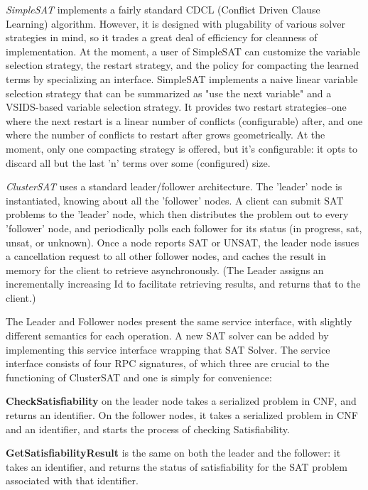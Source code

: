\documentclass[10pt]{article}
\begin{document}
  \textit{SimpleSAT} implements a fairly standard CDCL (Conflict Driven Clause Learning) algorithm.  However, it is designed with plugability of various
  solver strategies in mind, so it trades a great deal of efficiency for cleanness of implementation.  At the moment, a user of SimpleSAT can customize
  the variable selection strategy, the restart strategy, and the policy for compacting the learned terms by specializing an interface.  SimpleSAT implements
  a naive linear variable selection strategy that can be summarized as "use the next variable" and a VSIDS-based variable selection strategy.  It provides two
  restart strategies--one where the next restart is a linear number of conflicts (configurable) after, and one where the number of conflicts to restart after grows geometrically.
  At the moment, only one compacting strategy is offered, but it's configurable:  it opts to discard all but the last 'n' terms over some (configured) size.
  
  \textit{ClusterSAT} uses a standard leader/follower architecture.  The 'leader' node is instantiated, knowing about all the 'follower' nodes.  A client
  can submit SAT problems to the 'leader' node, which then distributes the problem out to every 'follower' node, and periodically polls each follower
  for its status (in progress, sat, unsat, or unknown).  Once a node reports SAT or UNSAT, the leader node issues a cancellation request to all other follower nodes, and 
  caches the result in memory for the client to retrieve asynchronously.  (The Leader assigns an incrementally increasing Id to facilitate retrieving results, and returns that to the client.)
  
  The Leader and Follower nodes present the same service interface, with slightly different semantics for each operation.  A new SAT solver can be added by implementing
  this service interface wrapping that SAT Solver.  The service interface consists of four RPC signatures, of which three are crucial to the functioning of ClusterSAT and one is 
  simply for convenience:
  
	\textbf{CheckSatisfiability} on the leader node takes a serialized problem in CNF, and returns an identifier.  On the follower nodes, it takes a serialized problem in CNF and an identifier, and 
	starts the process of checking Satisfiability.
	
	\textbf{GetSatisfiabilityResult} is the same on both the leader and the follower:  it takes an identifier, and returns the status of satisfiability for the SAT problem associated with that identifier.
	
\end{document}
